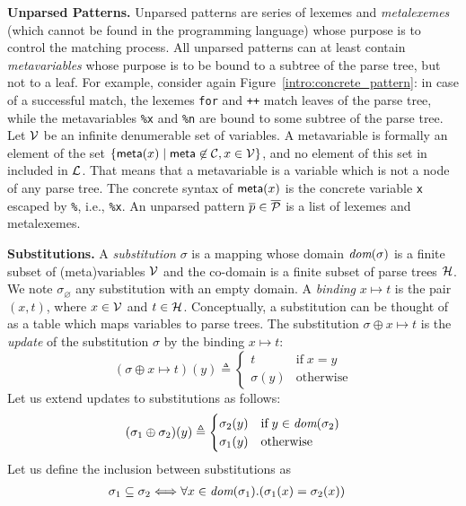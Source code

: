 \textbf{Unparsed Patterns.} Unparsed patterns are series of lexemes
and \emph{meta\-lexemes} (which cannot be found in the programming
language) whose purpose is to control the matching process. All
unparsed patterns can at least contain \emph{meta\-variables} whose
purpose is to be bound to a subtree of the parse tree, but not to a
leaf. For example, consider again Figure~\ref{intro:concrete_pattern}:
in case of a successful match, the lexemes \texttt{for} and
\texttt{++} match leaves of the parse tree, while the meta\-variables
\texttt{\%x} and \texttt{\%n} are bound to some subtree of the parse
tree. Let \({\cal V}\) be an infinite denumerable set of variables. A
meta\-variable is formally an element of the set \(\{\meta{x} \mid
\textsf{meta} \not\in {\cal C}, x \in {\cal V}\}\), and no element of
this set in included in \({\cal L}\). That means that a meta\-variable
is a variable which is not a node of any parse tree. The concrete
syntax of \(\textsf{meta}(x)\) is the concrete variable \texttt{x} escaped by
\texttt{\%}, i.e., \texttt{\%x}. An unparsed pattern \(\overline{p}
\in \overline{\cal P}\) is a list of lexemes and meta\-lexemes.

\textbf{Substitutions.} A \emph{substitution} \(\sigma\) is a mapping
whose domain \(\text{\it dom}(\sigma)\) is a finite subset of (meta)variables
\({\cal V}\) and the co\hyp{}domain is a finite subset of parse trees
\({\cal H}\). We note \(\sigma_\varnothing\) any substitution with an
empty domain. A \emph{binding} \(x \mapsto t\) is the pair \((x, t)\),
where \(x \in {\cal V}\) and \(t \in {\cal H}\). Conceptually, a
substitution can be thought of as a table which maps variables to
parse trees. The substitution \(\sigma \oplus x \mapsto t\) is the
\emph{update} of the substitution \(\sigma\) by the binding \(x
\mapsto t\):
\begin{equation}
(\sigma \oplus x \mapsto t)(y) \triangleq
\begin{cases}
  t         & \text{if} \; x = y\\
  \sigma(y) & \text{otherwise}
\end{cases}
\label{model:oplus}
\end{equation}
Let us extend updates to substitutions as follows:
\begin{equation}
(\sigma_1 \oplus \sigma_2)(y) \triangleq
\begin{cases}
  \sigma_2(y) & \text{if} \; y \in \text{\it dom}(\sigma_2)\\
  \sigma_1(y) & \text{otherwise}
\end{cases}
\label{model:oplus:ext}
\end{equation}
Let us define the inclusion between substitutions as
\begin{align}
  \sigma_1 \subseteq \sigma_2
&\Longleftrightarrow 
  \forall x \in \text{\it dom}(\sigma_1).(\sigma_1(x) = \sigma_2(x))\label{model:incl}
\end{align}

